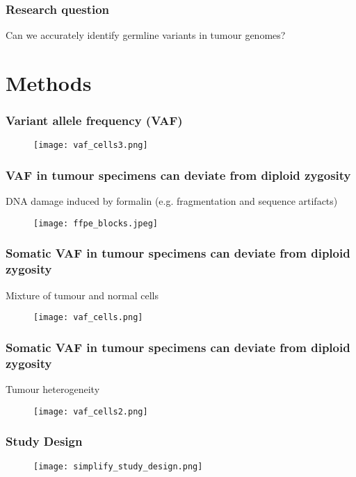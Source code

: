 \documentclass{beamer}
\begin{document}
\begin{frame}
\frametitle{Research question}
Can we accurately identify germline variants in tumour genomes?
\end{frame}

\section{Methods}

\begin{frame}
\frametitle{Variant allele frequency (VAF)}
\begin{figure}[t]
    \texttt{[image: vaf\_cells3.png]}
\end{figure}
\end{frame}

\begin{frame}
\frametitle{VAF in tumour specimens can deviate from diploid zygosity}
DNA damage induced by formalin (e.g. fragmentation and sequence artifacts)
\begin{figure}[t]
    \texttt{[image: ffpe\_blocks.jpeg]}
\end{figure}
\end{frame}

\begin{frame}
\frametitle{Somatic VAF in tumour specimens can deviate from diploid zygosity}
Mixture of tumour and normal cells
\begin{figure}[t]
    \texttt{[image: vaf\_cells.png]}
\end{figure}
\end{frame}

\begin{frame}
\frametitle{Somatic VAF in tumour specimens can deviate from diploid zygosity}
Tumour heterogeneity
\begin{figure}[t]
    \texttt{[image: vaf\_cells2.png]}
\end{figure}
\end{frame}

\begin{frame}
\frametitle{Study Design}
\begin{figure}[t]
    \texttt{[image: simplify\_study\_design.png]}
\end{figure}
\end{frame}

\end{document}
